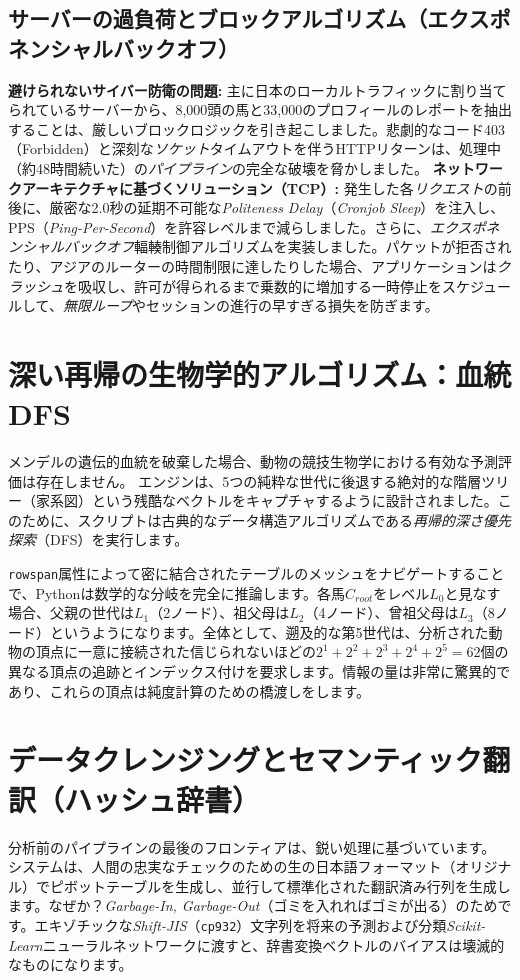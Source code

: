 \documentclass[12pt,a4paper]{article}
\begin{document}
\subsection{サーバーの過負荷とブロックアルゴリズム（エクスポネンシャルバックオフ）}
\textbf{避けられないサイバー防衛の問題:} 主に日本のローカルトラフィックに割り当てられているサーバーから、8,000頭の馬と33,000のプロフィールのレポートを抽出することは、厳しいブロックロジックを引き起こしました。悲劇的なコード403（Forbidden）と深刻な\textit{ソケット}タイムアウトを伴うHTTPリターンは、処理中（約48時間続いた）の\textit{パイプライン}の完全な破壊を脅かしました。
\textbf{ネットワークアーキテクチャに基づくソリューション（TCP）:} 発生した各\textit{リクエスト}の前後に、厳密な2.0秒の延期不可能な\textit{Politeness Delay}（\textit{Cronjob Sleep}）を注入し、PPS（\textit{Ping-Per-Second}）を許容レベルまで減らしました。さらに、\textit{エクスポネンシャルバックオフ}輻輳制御アルゴリズムを実装しました。パケットが拒否されたり、アジアのルーターの時間制限に達したりした場合、アプリケーションは\textit{クラッシュ}を吸収し、許可が得られるまで乗数的に増加する一時停止をスケジュールして、\textit{無限ループ}やセッションの進行の早すぎる損失を防ぎます。

\section{深い再帰の生物学的アルゴリズム：血統DFS}
メンデルの遺伝的血統を破棄した場合、動物の競技生物学における有効な予測評価は存在しません。
エンジンは、5つの純粋な世代に後退する絶対的な階層ツリー（家系図）という残酷なベクトルをキャプチャするように設計されました。このために、スクリプトは古典的なデータ構造アルゴリズムである\textit{再帰的深さ優先探索}（DFS）を実行します。

\texttt{rowspan}属性によって密に結合されたテーブルのメッシュをナビゲートすることで、Pythonは数学的な分岐を完全に推論します。各馬$C_{root}$をレベル$L_0$と見なす場合、父親の世代は$L_1$（2ノード）、祖父母は$L_2$（4ノード）、曾祖父母は$L_3$（8ノード）というようになります。全体として、遡及的な第5世代は、分析された動物の頂点に一意に接続された信じられないほどの$2^1 + 2^2 + 2^3 + 2^4 + 2^5 = 62$個の異なる頂点の追跡とインデックス付けを要求します。情報の量は非常に驚異的であり、これらの頂点は純度計算のための橋渡しをします。

\section{データクレンジングとセマンティック翻訳（ハッシュ辞書）}
分析前のパイプラインの最後のフロンティアは、鋭い処理に基づいています。
システムは、人間の忠実なチェックのための生の日本語フォーマット（オリジナル）でピボットテーブルを生成し、並行して標準化された翻訳済み行列を生成します。なぜか？\textit{Garbage-In, Garbage-Out}（ゴミを入れればゴミが出る）のためです。エキゾチックな\textit{Shift-JIS}（\texttt{cp932}）文字列を将来の予測および分類\textit{Scikit-Learn}ニューラルネットワークに渡すと、辞書変換ベクトルのバイアスは壊滅的なものになります。
\end{document}
